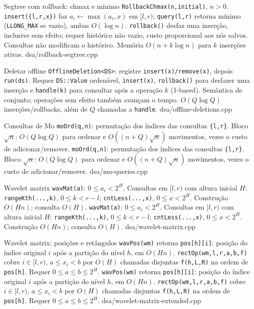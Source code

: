 \templateentry
{Segtree com rollback: chmax e mínimo}
{}
{\texttt{RollbackChmax(n,initial)}, $n>0$. \texttt{insert(\{l,r,x\})} faz $a_i\gets\max(a_i,x)$ em $[l,r)$; \texttt{query(l,r)} retorna mínimo (\texttt{LLONG\_MAX} se vazio), ambas $O(\log n)$. \texttt{rollback()} desfaz uma inserção, inclusive sem efeito; requer histórico não vazio, custo proporcional aos nós salvos. Consultas não modificam o histórico. Memória $O(n+k\log n)$ para $k$ inserções ativas.}
{dsa/rollback-segtree.cpp}

\templateentry
{Deletar offline}
{}
{\texttt{OfflineDeletion<DS>}: registre \texttt{insert(x)/remove(x)}, depois \texttt{run(ds)}. Requer \texttt{DS::Value} ordenável, \texttt{insert(x)}, \texttt{rollback()} para desfazer uma inserção e \texttt{handle(k)} para consultar após a operação $k$ (1-based). Semântica de conjunto; operações sem efeito também avançam o tempo. $O(Q\log Q)$ inserções/rollbacks, além de $Q$ chamadas a \texttt{handle}.}
{dsa/offline-deletions.cpp}

\fi

\templateentry
{Consultas de Mo}
{\texttt{moOrd(q,n)}: permutação dos índices das consultas \texttt{\{l,r\}}. Bloco $\sqrt n$: $O(Q\log Q)$ para ordenar e $O((n+Q)\sqrt n)$ movimentos, vezes o custo de adicionar/remover.}
{\texttt{moOrd(q,n)}: permutação dos índices das consultas \texttt{\{l,r\}}. Bloco $\sqrt n$: $O(Q\log Q)$ para ordenar e $O((n+Q)\sqrt n)$ movimentos, vezes o custo de adicionar/remover.}
{dsa/mo-queries.cpp}

\templateentry
{Wavelet matrix}
{\texttt{wavMat(a)}: $0\le a_i<2^H$. Consultas em $[l,r)$ com altura inicial $H$: \texttt{rangeKth(...,k)}, $0\le k<r-l$; \texttt{cntLess(...,x)}, $0\le x<2^H$. Construção $O(Hn)$; consulta $O(H)$.}
{\texttt{wavMat(a)}: $0\le a_i<2^H$. Consultas em $[l,r)$ com altura inicial $H$: \texttt{rangeKth(...,k)}, $0\le k<r-l$; \texttt{cntLess(...,x)}, $0\le x<2^H$. Construção $O(Hn)$; consulta $O(H)$.}
{dsa/wavelet-matrix.cpp}

\templateentry
{Wavelet matrix: posições e retângulos}
{\texttt{wavPos(wm)} retorna \texttt{pos[h][i]}: posição do índice original $i$ após a partição do nível $h$, em $O(Hn)$. \texttt{rectOp(wm,l,r,a,b,f)} cobre $i\in[l,r)$, $a\le x_i<b$ por $O(H)$ chamadas disjuntas \texttt{f(h,L,R)} na ordem de \texttt{pos[h]}. Requer $0\le a\le b\le2^H$.}
{\texttt{wavPos(wm)} retorna \texttt{pos[h][i]}: posição do índice original $i$ após a partição do nível $h$, em $O(Hn)$. \texttt{rectOp(wm,l,r,a,b,f)} cobre $i\in[l,r)$, $a\le x_i<b$ por $O(H)$ chamadas disjuntas \texttt{f(h,L,R)} na ordem de \texttt{pos[h]}. Requer $0\le a\le b\le2^H$.}
{dsa/wavelet-matrix-extended.cpp}

